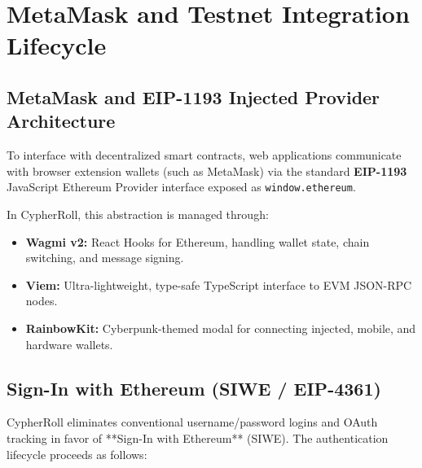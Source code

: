\section{MetaMask and Testnet Integration Lifecycle}

\subsection{MetaMask and EIP-1193 Injected Provider Architecture}
To interface with decentralized smart contracts, web applications communicate with browser extension wallets (such as MetaMask) via the standard \textbf{EIP-1193} JavaScript Ethereum Provider interface exposed as \texttt{window.ethereum}.

In CypherRoll, this abstraction is managed through:
\begin{itemize}[leftmargin=1.5em]
    \item \textbf{Wagmi v2:} React Hooks for Ethereum, handling wallet state, chain switching, and message signing.
    \item \textbf{Viem:} Ultra-lightweight, type-safe TypeScript interface to EVM JSON-RPC nodes.
    \item \textbf{RainbowKit:} Cyberpunk-themed modal for connecting injected, mobile, and hardware wallets.
\end{itemize}

\subsection{Sign-In with Ethereum (SIWE / EIP-4361)}
CypherRoll eliminates conventional username/password logins and OAuth tracking in favor of **Sign-In with Ethereum** (SIWE). The authentication lifecycle proceeds as follows:

